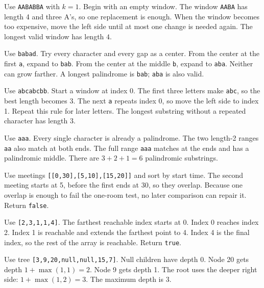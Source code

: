 \expandafter\def\csname lessontrace@28\endcsname{\visualtrace
  {Use \texttt{AABABBA} with \(k=1\). Begin with an empty window.}
  {The window \texttt{AABA} has length 4 and three A's, so one replacement is enough.}
  {When the window becomes too expensive, move the left side until at most one change is needed again.}
  {The longest valid window has length \(4\).}}

\expandafter\def\csname lessontrace@29\endcsname{\visualtrace
  {Use \texttt{babad}. Try every character and every gap as a center.}
  {From the center at the first \texttt{a}, expand to \texttt{bab}.}
  {From the center at the middle \texttt{b}, expand to \texttt{aba}. Neither can grow farther.}
  {A longest palindrome is \texttt{bab}; \texttt{aba} is also valid.}}

\expandafter\def\csname lessontrace@30\endcsname{\visualtrace
  {Use \texttt{abcabcbb}. Start a window at index 0.}
  {The first three letters make \texttt{abc}, so the best length becomes 3.}
  {The next \texttt{a} repeats index 0, so move the left side to index 1. Repeat this rule for later letters.}
  {The longest substring without a repeated character has length \(3\).}}

\expandafter\def\csname lessontrace@31\endcsname{\visualtrace
  {Use \texttt{aaa}. Every single character is already a palindrome.}
  {The two length-2 ranges \texttt{aa} also match at both ends.}
  {The full range \texttt{aaa} matches at the ends and has a palindromic middle.}
  {There are \(3+2+1=6\) palindromic substrings.}}

\expandafter\def\csname lessontrace@32\endcsname{\visualtrace
  {Use meetings \texttt{[[0,30],[5,10],[15,20]]} and sort by start time.}
  {The second meeting starts at 5, before the first ends at 30, so they overlap.}
  {Because one overlap is enough to fail the one-room test, no later comparison can repair it.}
  {Return \texttt{false}.}}

\expandafter\def\csname lessontrace@33\endcsname{\visualtrace
  {Use \texttt{[2,3,1,1,4]}. The farthest reachable index starts at 0.}
  {Index 0 reaches index 2. Index 1 is reachable and extends the farthest point to 4.}
  {Index 4 is the final index, so the rest of the array is reachable.}
  {Return \texttt{true}.}}

\expandafter\def\csname lessontrace@34\endcsname{\visualtrace
  {Use tree \texttt{[3,9,20,null,null,15,7]}. Null children have depth 0.}
  {Node 20 gets depth \(1+\max(1,1)=2\). Node 9 gets depth 1.}
  {The root uses the deeper right side: \(1+\max(1,2)=3\).}
  {The maximum depth is \(3\).}}

